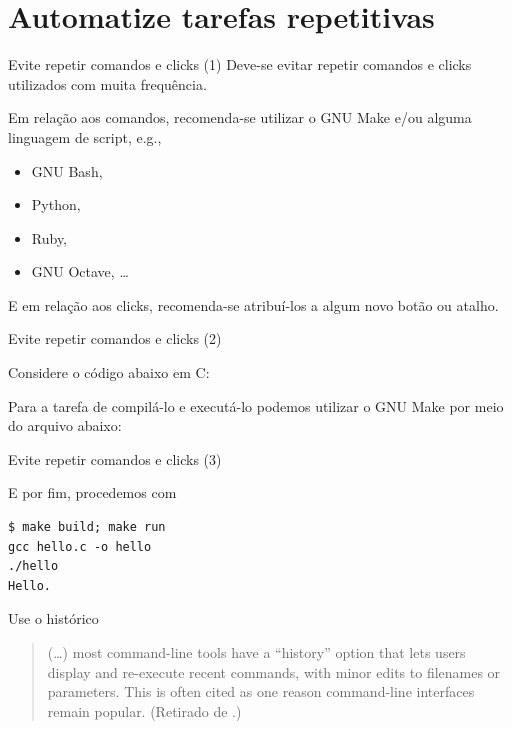 \documentclass[11pt]{beamer}
\begin{document}
\section{Automatize tarefas repetitivas}
\begin{frame}{Evite repetir comandos e clicks (1)}
    Deve-se evitar repetir comandos e clicks utilizados com muita frequência.

    Em relação aos comandos, recomenda-se utilizar o GNU Make e/ou alguma
    linguagem de script, e.g.,
    \begin{itemize}
        \item GNU Bash,
        \item Python,
        \item Ruby,
        \item GNU Octave, \ldots
    \end{itemize}

    E em relação aos clicks, recomenda-se atribuí-los a algum novo botão ou
    atalho.
\end{frame}

\begin{frame}[fragile]{Evite repetir comandos e clicks (2)}
    \begin{example}
        Considere o código abaixo em C:
        
        Para a tarefa de compilá-lo e executá-lo podemos utilizar o GNU Make
        por meio do arquivo abaixo:
        
    \end{example}
\end{frame}

\begin{frame}[fragile]{Evite repetir comandos e clicks (3)}
    \begin{example}[Continuação]
         E por fim,  procedemos com
        \begin{lstlisting}
$ make build; make run
gcc hello.c -o hello
./hello
Hello.
        \end{lstlisting}
    \end{example}
\end{frame}

\begin{frame}{Use o histórico}
    \begin{quotation}
        (\ldots) most command-line tools have a ``history'' option that
        lets users display and re-execute recent commands, with minor edits to
        filenames or parameters. This is often cited as one reason command-line
        interfaces remain popular. (Retirado de \cite{Aruliah-2012-Best}.)
    \end{quotation}
\end{frame}
\end{document}
